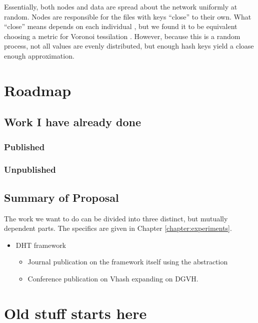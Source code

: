 Essentially, both nodes and data are spread about the network uniformly at random.
Nodes are responsible for the files with keys ``close'' to their own.
What ``close'' means depends on each individual , but we found it to be equivalent choosing a metric for Voronoi tessilation \cite{vhash}.
However, because this is a random process, not all values are evenly distributed, but enough hash keys yield a cloase enough approximation.





\section{Roadmap}

\subsection{Work I have already done}

\subsubsection{Published}

\subsubsection{Unpublished}

\subsection{Summary of Proposal}


The work we want to do can be divided into three distinct, but mutually dependent parts.
The specifics are given in Chapter \ref{chapter:experiments}.



\begin{itemize}
	\item DHT framework
	\begin{itemize}
		\item Journal publication on the framework itself using the abstraction
		\item Conference publication on Vhash expanding on DGVH.
	\end{itemize}
\end{itemize}

\section{Old stuff starts here}



